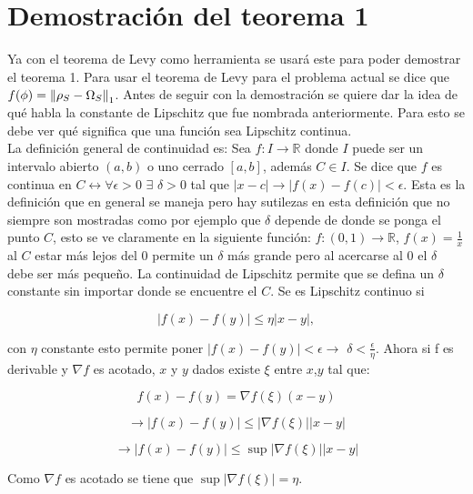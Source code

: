 \section{Demostración del teorema 1}
Ya con el teorema de Levy como herramienta se usará este para poder demostrar el teorema 1. Para usar el teorema de Levy para el problema actual se dice que $f(\phi)= \norm{\rho_{S} - \Omega_{S}}_{1}$. Antes de seguir con la demostración se quiere dar la idea de qué habla la constante de Lipschitz que fue nombrada anteriormente. Para esto se debe ver qué significa que una función sea Lipschitz continua. \\
La definición general de continuidad es: Sea $f: I \to \mathbb{R}$ donde $I$ puede ser un intervalo abierto $(a,b)$ o uno cerrado $[a,b]$, además $C \in I$. Se dice que $f$ es continua en $C \longleftrightarrow \forall \epsilon >0 $ $\exists$ $ \delta >0 $ tal que  $ |x-c|\longrightarrow |f(x)-f(c)|< \epsilon $. Esta es la definición que en general se maneja pero hay sutilezas en esta definición que no siempre son mostradas como por ejemplo que $\delta$ depende de donde se ponga el  punto $C$, esto se ve claramente en la siguiente función: $f: (0,1) \to \mathbb{R}$, $f(x)=\frac{1}{x} $ al $C$ estar más lejos del $0$ permite un $\delta$ más grande pero al acercarse al $0$ el $\delta$ debe ser más pequeño.
La continuidad de Lipschitz permite que se defina un $\delta$ constante sin importar donde se encuentre el $C$. Se es Lipschitz continuo si 

\begin{equation}
|f(x) -f(y)| \le \eta |x-y|,
\end{equation}

 con $\eta$ constante esto permite poner $|f(x)-f(y)| < \epsilon \to $ $\delta < \frac{\epsilon}{\eta} $. Ahora si f es derivable y $\nabla f$ es acotado, $x$ y $y$ dados existe $\xi$ entre $x$,$y$ tal que:
 
\begin{equation}
f(x)-f(y)= \nabla f(\xi) (x-y)
\end{equation}

\begin{equation}
\to |f(x)- f(y)| \le |\nabla f(\xi)| |x-y|
\end{equation}

\begin{equation}
\to |f(x)- f(y)| \le \sup|\nabla f(\xi)| |x-y|
\end{equation}
 
Como $\nabla f$ es acotado se tiene que $\sup |\nabla f(\xi)|=\eta$.\\

